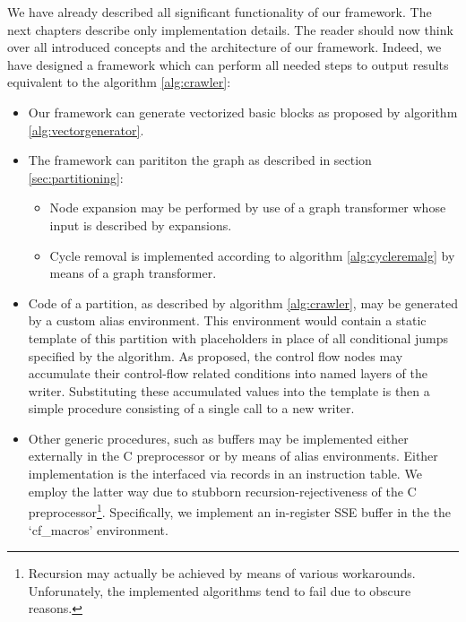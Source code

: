 We have already described all significant functionality of our framework. The next chapters describe only implementation details. The reader should now think over all introduced concepts and the architecture of our framework. Indeed, we have designed a framework which can perform all needed steps to output results equivalent to the algorithm \ref{alg:crawler}:
\begin{itemize}
  \item Our framework can generate vectorized basic blocks as proposed by algorithm \ref{alg:vectorgenerator}.
  \item The framework can parititon the graph as described in section \ref{sec:partitioning}:
  \begin{itemize}
    \item Node expansion may be performed by use of a graph transformer whose input is described by expansions.
    \item Cycle removal is implemented according to algorithm \ref{alg:cycleremalg} by means of a graph transformer.
  \end{itemize}
  \item Code of a partition, as described by algorithm \ref{alg:crawler}, may be generated by a custom alias environment. This environment would contain a static template of this partition with placeholders in place of all conditional jumps specified by the algorithm. As proposed, the control flow nodes may accumulate their control-flow related conditions into named layers of the writer. Substituting these accumulated values into the template is then a simple procedure consisting of a single call to a new writer.
  \item Other generic procedures, such as buffers may be implemented either externally in the C preprocessor or by means of alias environments. Either implementation is the interfaced via records in an instruction table. We employ the latter way due to stubborn recursion-rejectiveness of the C preprocessor\footnote{Recursion may actually be achieved by means of various workarounds. Unforunately, the implemented algorithms tend to fail due to obscure reasons.}. Specifically, we implement an in-register SSE buffer in the the `cf\_macros' environment.
\end{itemize}
